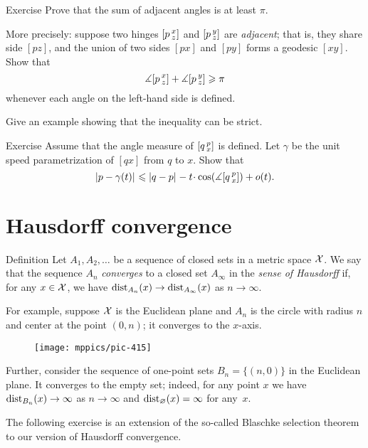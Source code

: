 \begin{thm}{Exercise}\label{ex:adjacent-angles}
Prove that the sum of adjacent angles is at least $\pi$.

More precisely: suppose two hinges $[p\,{}^{x}_{z}]$ and $[p\,{}^{y}_{z}]$ are \emph{adjacent};
that is, they share side $[pz]$, and the union of two sides $[px]$ and $[py]$ forms a geodesic $[xy]$.
Show that
\[\measuredangle[p\,{}^{x}_{z}]+\measuredangle[p\,{}^{y}_{z}]\geqslant \pi\]
whenever  each angle on the left-hand side is defined.

Give an example showing that the inequality can be strict.
\end{thm}

\begin{thm}{Exercise}\label{ex:first-var}
Assume that the angle measure of $[q\,{}^{p}_{x}]$ is defined.
Let $\gamma$ be the unit speed parametrization of $[qx]$ from $q$ to $x$.
Show that
\[\dist{p}{\gamma(t)}{}
\le
\dist{q}{p}{}-t\cdot \cos(\mangle\hinge q p x)+o(t).\]

\end{thm}

\section{Hausdorff convergence}\label{sec:Hausdorff convergence}

\begin{thm}{Definition}\label{def:gen-Haus-conv}
Let $A_1,A_2,\dots$ be a sequence of closed sets in a metric space $\mathcal{X}$.
We say that the sequence $A_n$ \emph{converges} to a closed set $A_\infty$ in the {}\emph{sense of Hausdorff} if, for any $x\in\mathcal{X}$, we have
$\mathrm{dist}_{A_n}(x)\to \mathrm{dist}_{A_\infty}(x)$ as $n\to\infty$.
\end{thm}

For example, suppose $\mathcal{X}$ is the Euclidean plane and $A_n$ is the circle with radius $n$ and center at the point $(0,n)$; it converges to the $x$-axis.

\begin{figure}[ht!]
\vskip-0mm
\centering
\texttt{[image: mppics/pic-415]}
\end{figure}

Further, consider the sequence of one-point sets $B_n=\{(n,0)\}$ in the Euclidean plane.
It converges to the empty set;
indeed, for any point $x$ we have $\mathrm{dist}_{B_n}(x)\to\infty$ as $n\to \infty$ and $\mathrm{dist}_{\varnothing}(x)= \infty$ for any~$x$.

The following exercise is an extension of the so-called Blaschke selection theorem to our version of Hausdorff convergence.

